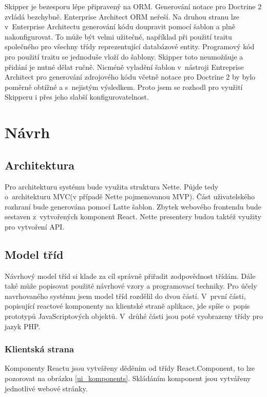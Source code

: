 \documentclass[thesis=B,czech]{FITthesis}[2012/06/26]
\begin{document}
	Skipper je bezesporu lépe připravený na ORM. Generování notace pro Doctrine 2 zvládá bezchybně. Enterprise Architect ORM neřeší. Na druhou stranu lze v~Enterprise Architectu generování kódu doupravit pomocí šablon a plně nakonfigurovat. To může být velmi užitečné, například při použití traitu společného pro všechny třídy reprezentující databázové entity. Programový kód pro použití traitu se jednoduše vloží do šablony. Skipper toto neumožňuje a přidání je nutné dělat ručně. Nicméně vyladění šablon v~nástroji Entreprise Architect pro generování zdrojového kódu včetně notace pro Doctrine 2 by bylo poměrně obtížné a s~nejistým výsledkem. Proto jsem se rozhodl pro využití Skipperu i přes jeho slabší konfigurovatelnost.	


\chapter{Návrh}

\section{Architektura}
Pro architekturu systému bude využita struktura Nette. Půjde tedy o~architekturu MVC(v případě Nette pojmenovanou MVP). Část uživatelského rozhraní bude generována pomocí Latte šablon. Zbytek webového frontendu bude sestaven z~vytvořených komponent React. Nette presentery budou taktéž využity pro vytvoření API.

\section{Model tříd}
	Návrhový model tříd si klade za cíl správně přiřadit zodpovědnost třídám. Dále také může popisovat použité návrhové vzory a programovací techniky.\cite{si1_pred6} Pro účely navrhovaného systému jsem model tříd rozdělil do dvou částí. V~první části, popisující reactové komponenty na klientské straně aplikace, jde spíše o~popis prototypů JavaScriptových objektů. V~drůhé části jsou poté vyobrazeny třídy pro jazyk PHP.
	
\subsection{Klientská strana}
	Komponenty Reactu jsou vytvářeny děděním od třídy React.Component, to lze pozorovat na obrázku \ref{ui_komponents}. Skládáním komponent jsou vytvářeny jednotlivé webové stránky.
	
\end{document}
